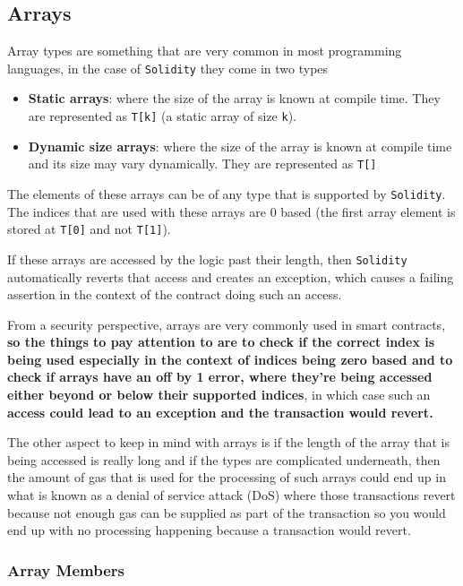 \subsection{Arrays}\label{arrays}

Array types are something that are very common in most programming
languages, in the case of \texttt{Solidity} they come in two types

\begin{itemize}
\tightlist
\item
  \textbf{Static arrays}: where the size of the array is known at
  compile time. They are represented as \texttt{T{[}k{]}} (a static
  array of size \texttt{k}).
\item
  \textbf{Dynamic size arrays}: where the size of the array is known at
  compile time and its size may vary dynamically. They are represented
  as \texttt{T{[}{]}}
\end{itemize}

The elements of these arrays can be of any type that is supported by
\texttt{Solidity}. The indices that are used with these arrays are 0
based (the first array element is stored at \texttt{T{[}0{]}} and not
\texttt{T{[}1{]}}).

If these arrays are accessed by the logic past their length, then
\texttt{Solidity} automatically reverts that access and creates an
exception, which causes a failing assertion in the context of the
contract doing such an access.

From a security perspective, arrays are very commonly used in smart
contracts, \textbf{so the things to pay attention to are to check if the
correct index is being used especially in the context of indices being
zero based and to check if arrays have an off by 1 error, where they're
being accessed either beyond or below their supported indices}, in which
case such an \textbf{access could lead to an exception and the
transaction would revert.}

The other aspect to keep in mind with arrays is if the length of the
array that is being accessed is really long and if the types are
complicated underneath, then the amount of gas that is used for the
processing of such arrays could end up in what is known as a denial of
service attack (DoS) where those transactions revert because not enough
gas can be supplied as part of the transaction so you would end up with
no processing happening because a transaction would revert.

\subsubsection{Array Members}\label{array-members}

